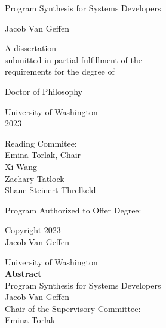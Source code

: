 \documentclass[12pt]{book}
\title{\mytitle}
\author{\myauthor}
\def\mytitle{Program Synthesis for Systems Developers}
\def\myauthor{Jacob Van Geffen}
\def\year{2023}
\begin{document}
\pagestyle{empty}

\begin{center}
  {\huge \mytitle}
  \vfill

  {\Large \myauthor}
  \vfill

  \begin{spacing}{1}
    A dissertation \\
    submitted in partial fulfillment of the \\
    requirements for the degree of
  \end{spacing}
  \vfill

  Doctor of Philosophy
  \vfill

  University of Washington \\
  \year
  \vfill

  Reading Commitee: \\
  Emina Torlak, Chair \\
  Xi Wang \\
  Zachary Tatlock \\
  Shane Steinert-Threlkeld
  \vfill

  \begin{spacing}{1}
    Program Authorized to Offer Degree: \\
    \cse
  \end{spacing}
  \clearpage

  \textcopyright{} Copyright \year\\
  \myauthor
  \clearpage
\end{center}

\pagestyle{plain}
\setcounter{page}{1}

\begin{center}
  University of Washington \\[1em]
  \textbf{Abstract}        \\[1em]
  \mytitle                 \\[1em]
  \myauthor                \\[1em]

  Chair of the Supervisory Committee: \\[-0.5em]
  Emina Torlak \\[-0.5em]
  \pgas
  \\[2em]
\end{center}

\end{document}
